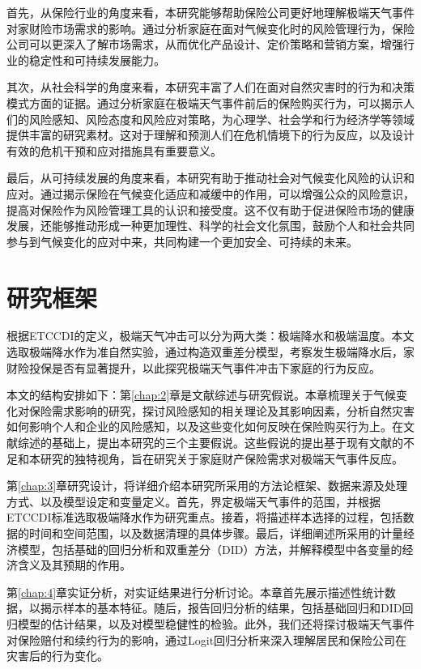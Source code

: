 首先，从保险行业的角度来看，本研究能够帮助保险公司更好地理解极端天气事件对家财险市场需求的影响。通过分析家庭在面对气候变化时的风险管理行为，保险公司可以更深入了解市场需求，从而优化产品设计、定价策略和营销方案，增强行业的稳定性和可持续发展能力。

其次，从社会科学的角度来看，本研究丰富了人们在面对自然灾害时的行为和决策模式方面的证据。通过分析家庭在极端天气事件前后的保险购买行为，可以揭示人们的风险感知、风险态度和风险应对策略，为心理学、社会学和行为经济学等领域提供丰富的研究素材。这对于理解和预测人们在危机情境下的行为反应，以及设计有效的危机干预和应对措施具有重要意义。

最后，从可持续发展的角度来看，本研究有助于推动社会对气候变化风险的认识和应对。通过揭示保险在气候变化适应和减缓中的作用，可以增强公众的风险意识，提高对保险作为风险管理工具的认识和接受度。这不仅有助于促进保险市场的健康发展，还能够推动形成一种更加理性、科学的社会文化氛围，鼓励个人和社会共同参与到气候变化的应对中来，共同构建一个更加安全、可持续的未来。

\section{研究框架}
根据ETCCDI的定义，极端天气冲击可以分为两大类：极端降水和极端温度。本文选取极端降水作为准自然实验，通过构造双重差分模型，考察发生极端降水后，家财险投保是否有显著提升，以此探究极端天气事件冲击下家庭的行为反应。

本文的结构安排如下：第\ref{chap:2}章是文献综述与研究假说。本章梳理关于气候变化对保险需求影响的研究，探讨风险感知的相关理论及其影响因素，分析自然灾害如何影响个人和企业的风险感知，以及这些变化如何反映在保险购买行为上。在文献综述的基础上，提出本研究的三个主要假说。这些假说的提出基于现有文献的不足和本研究的独特视角，旨在研究关于家庭财产保险需求对极端天气事件反应。

第\ref{chap:3}章研究设计，将详细介绍本研究所采用的方法论框架、数据来源及处理方式、以及模型设定和变量定义。首先，界定极端天气事件的范围，并根据ETCCDI标准选取极端降水作为研究重点。接着，将描述样本选择的过程，包括数据的时间和空间范围，以及数据清理的具体步骤。最后，详细阐述所采用的计量经济模型，包括基础的回归分析和双重差分（DID）方法，并解释模型中各变量的经济含义及其预期的作用。

第\ref{chap:4}章实证分析，对实证结果进行分析讨论。本章首先展示描述性统计数据，以揭示样本的基本特征。随后，报告回归分析的结果，包括基础回归和DID回归模型的估计结果，以及对模型稳健性的检验。此外，我们还将探讨极端天气事件对保险赔付和续约行为的影响，通过Logit回归分析来深入理解居民和保险公司在灾害后的行为变化。

